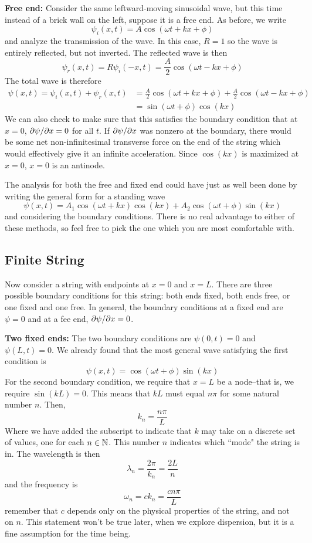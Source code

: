 \textbf{Free end:} Consider the same leftward-moving sinusoidal wave, but this time instead of a brick wall on the left, suppose it is a free end. As before, we write
\[ \psi_i(x,t) = A\cos(\omega t+kx+\phi) \]
and analyze the transmission of the wave. In this case, $R=1$ so the wave is entirely reflected, but not inverted. The reflected wave is then
\[ \psi_r(x,t) = R\psi_i(-x, t) = \frac{A}{2} \cos(\omega t-kx + \phi) \]
The total wave is therefore
\begin{align*}
    \psi(x,t) = \psi_i(x,t) + \psi_r(x,t) &= \frac{A}{2} \cos(\omega t +kx+\phi) + \frac{A}{2} \cos(\omega t-kx + \phi) \\
    &= \sin(\omega t+\phi)\cos(kx) 
\end{align*}
We can also check to make sure that this satisfies the boundary condition that at $x=0$, $\partial \psi/\partial x = 0$ for all $t$. If $\partial \psi/\partial x$ was nonzero at the boundary, there would be some net non-infinitesimal transverse force on the end of the string which would effectively give it an infinite acceleration. Since $\cos(kx)$ is maximized at $x=0$, $x=0$ is an antinode. 

The analysis for both the free and fixed end could have just as well been done by writing the general form for a standing wave
\[ \psi(x,t) = A_1\cos(\omega t+kx)\cos(kx) + A_2\cos(\omega t+\phi)\sin(kx)\]
and considering the boundary conditions. There is no real advantage to either of these methods, so feel free to pick the one which you are most comfortable with.
\subsection*{Finite String}
Now consider a string with endpoints at $x=0$ and $x=L$. There are three possible boundary conditions for this string: both ends fixed, both ends free, or one fixed and one free. In general, the boundary conditions at a fixed end are $\psi=0$ and at a fee end, $\partial \psi/\partial x = 0$.

\textbf{Two fixed ends:} The two boundary conditions are $\psi(0,t) = 0$ and $\psi(L, t) = 0$. We already found that the most general wave satisfying the first condition is 
\[ \psi(x,t) = \cos(\omega t+\phi)\sin(kx)\]
For the second boundary condition, we require that $x=L$ be a node--that is, we require $\sin(kL) = 0$. This means that $kL$ must equal $n\pi$ for some natural number $n$. Then, 
\[ k_n = \frac{n\pi }{L} \]
Where we have added the subscript to indicate that $k$ may take on a discrete set of values, one for each $n\in\mathbb{N}$. This number $n$ indicates which ``mode" the string is in. The wavelength is then
\[ \lambda_n  =\frac{2\pi}{k_n} = \frac{2L}{n}\]
and the frequency is
\[ \omega_n = ck_n = \frac{cn\pi }{L} \]
remember that $c$ depends only on the physical properties of the string, and not on $n$. This statement won't be true later, when we explore dispersion, but it is a fine assumption for the time being. 

